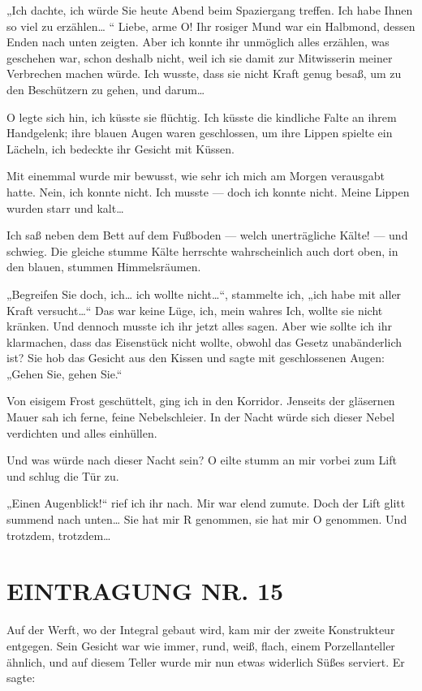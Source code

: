 „Ich dachte, ich würde Sie heute Abend beim Spaziergang treffen.
Ich habe Ihnen so viel zu erzählen\ldots{} “ Liebe, arme O! Ihr rosiger
Mund war ein Halbmond, dessen Enden nach unten zeigten. Aber ich
konnte ihr unmöglich alles erzählen, was geschehen war, schon
deshalb nicht, weil ich sie damit zur Mitwisserin meiner Verbrechen
machen würde. Ich wusste, dass sie nicht Kraft genug besaß, um zu
den Beschützern zu gehen, und darum\ldots{}

O legte sich hin, ich küsste sie flüchtig. Ich küsste die kindliche
Falte an ihrem Handgelenk; ihre blauen Augen waren geschlossen, um
ihre Lippen spielte ein Lächeln, ich bedeckte ihr Gesicht mit
Küssen.

Mit einemmal wurde mir bewusst, wie sehr ich mich am Morgen
verausgabt hatte. Nein, ich konnte nicht. Ich musste — doch ich
konnte nicht. Meine Lippen wurden starr und kalt\ldots{}

Ich saß neben dem Bett auf dem Fußboden — welch unerträgliche
Kälte! — und schwieg. Die gleiche stumme Kälte herrschte
wahrscheinlich auch dort oben, in den blauen, stummen
Himmelsräumen.

„Begreifen Sie doch, ich\ldots{} ich wollte nicht\ldots{}“, stammelte ich,
„ich habe mit aller Kraft versucht\ldots{}“ Das war keine Lüge, ich,
mein wahres Ich, wollte sie nicht kränken. Und dennoch musste ich
ihr jetzt alles sagen. Aber wie sollte ich ihr klarmachen, dass das
Eisenstück nicht wollte, obwohl das Gesetz unabänderlich ist? Sie
hob das Gesicht aus den Kissen und sagte mit geschlossenen Augen:
„Gehen Sie, gehen Sie.“

Von eisigem Frost geschüttelt, ging ich in den Korridor. Jenseits
der gläsernen Mauer sah ich ferne, feine Nebelschleier. In der
Nacht würde sich dieser Nebel verdichten und alles einhüllen.

Und was würde nach dieser Nacht sein? O eilte stumm an mir vorbei
zum Lift und schlug die Tür zu.

„Einen Augenblick!“ rief ich ihr nach. Mir war elend zumute. Doch
der Lift glitt summend nach unten\ldots{} Sie hat mir R genommen, sie
hat mir O genommen. Und trotzdem, trotzdem\ldots{}

\section{EINTRAGUNG NR. 15}

Auf der Werft, wo der Integral gebaut wird, kam mir der zweite
Konstrukteur entgegen. Sein Gesicht war wie
immer, rund, weiß, flach, einem Porzellanteller ähnlich, und auf
diesem Teller wurde mir nun etwas widerlich Süßes serviert. Er
sagte:


